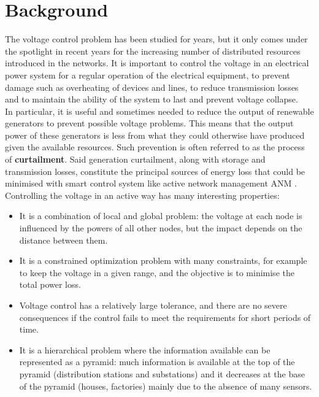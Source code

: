 \chapter{Background}

The voltage control problem has been studied for years, but it only comes under the spotlight in recent years for the increasing number of distributed resources introduced in the networks. It is important to control the voltage in an electrical power system for a regular operation of the electrical equipment, to prevent damage such as overheating of devices and lines, to reduce transmission losses and to maintain the ability of the system to last and prevent voltage collapse. \\

In particular, it is useful and sometimes needed to reduce the output of renewable generators to prevent possible voltage problems. This means that the output power of these generators is less from what they could otherwise have produced given the available resources. Such prevention is often referred to as the process of \textbf{curtailment}. Said generation curtailment, along with storage and transmission losses, constitute the principal sources of energy loss that could be minimised with smart control system like active network management \gls{ANM} \cite{gym-anm}. \\

\noindent Controlling the voltage in an active way has many interesting properties:
\begin{itemize}
    \item It is a combination of local and global problem: the voltage at each node is influenced by the powers of all other nodes, but the impact depends on the distance between them.
    
    \item It is a constrained optimization problem with many constraints, for example to keep the voltage in a given range, and the objective is to minimise the total power loss.
    
    \item Voltage control has a relatively large tolerance, and there are no severe consequences if the control fails to meet the requirements for short periods of time. \cite{wang2022multiagent}
    
    \item It is a hierarchical problem where the information available can be represented as a pyramid: much information is available at the top of the pyramid (distribution stations and substations) and it decreases at the base of the pyramid (houses, factories) mainly due to the absence of many sensors.
\end{itemize}

